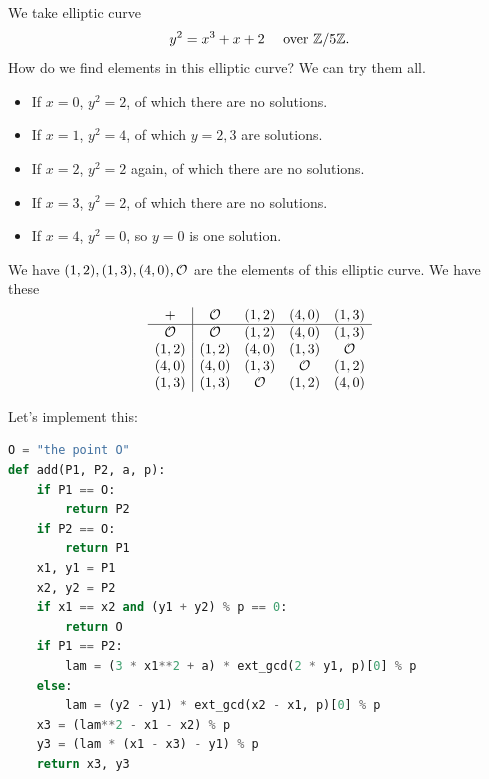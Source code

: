 \begin{example}
    We take elliptic curve
    \[y^2 = x^3 + x + 2\quad \text{ over }\mathbb Z/5\mathbb Z.\]
    How do we find elements in this elliptic curve? We can try them all.
    \begin{itemize}
        \item If $x = 0$, $y^2 = 2$, of which there are no solutions.
        \item If $x = 1$, $y^2 = 4$, of which $y = 2, 3$ are solutions.
        \item If $x = 2$, $y^2 = 2$ again, of which there are no solutions.
        \item If $x = 3$, $y^2 = 2$, of which there are no solutions.
        \item If $x = 4$, $y^2 = 0$, so $y = 0$ is one solution.
    \end{itemize}
    We have $(1,2), (1,3), (4,0), \mathcal{O}$ are the elements of this elliptic curve. We have these
    \[\begin{array}{c|cccc}
            +     & \mathcal{O}   & (1,2) & (4,0) & (1,3) \\ \hline
            \mathcal{O}   & \mathcal{O}   & (1,2) & (4,0) & (1,3) \\
            (1,2) & (1,2) & (4,0) & (1,3) & \mathcal{O}   \\
            (4,0) & (4,0) & (1,3) & \mathcal{O}   & (1,2) \\
            (1,3) & (1,3) & \mathcal{O}   & (1,2) & (4,0)
        \end{array}\]
\end{example}
Let's implement this:
\begin{lstlisting}[language=Python]
O = "the point O"
def add(P1, P2, a, p):
    if P1 == O:
        return P2
    if P2 == O:
        return P1
    x1, y1 = P1
    x2, y2 = P2
    if x1 == x2 and (y1 + y2) % p == 0:
        return O
    if P1 == P2:
        lam = (3 * x1**2 + a) * ext_gcd(2 * y1, p)[0] % p
    else:
        lam = (y2 - y1) * ext_gcd(x2 - x1, p)[0] % p
    x3 = (lam**2 - x1 - x2) % p
    y3 = (lam * (x1 - x3) - y1) % p
    return x3, y3
\end{lstlisting}